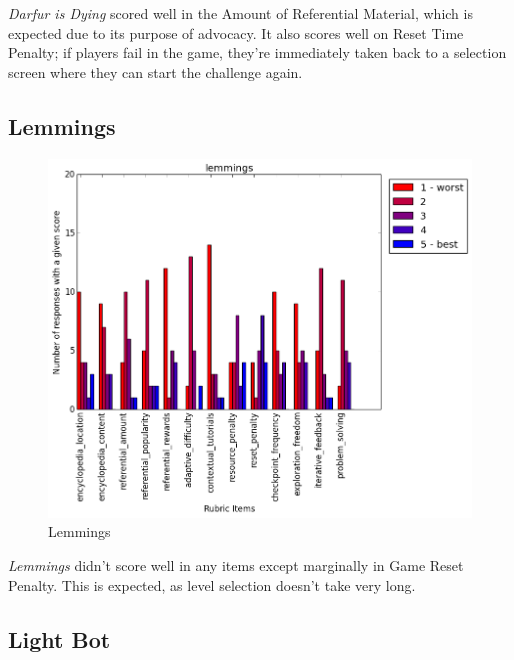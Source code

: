 				\textit{Darfur is Dying} scored well in the Amount of Referential Material, which is expected due to its purpose of advocacy. It also scores well on Reset Time Penalty; if players fail in the game, they're immediately taken back to a selection screen where they can start the challenge again.

			\subsection{Lemmings}

				\begin{figure}[] 
				\centering 
				\includegraphics[width=\textwidth, height=.4\textheight, keepaspectratio=true]{lemmings_scores.png} 
				\caption{Lemmings}
				\end{figure}

				\textit{Lemmings} didn't score well in any items except marginally in Game Reset Penalty. This is expected, as level selection doesn't take very long.

			\subsection{Light Bot}

